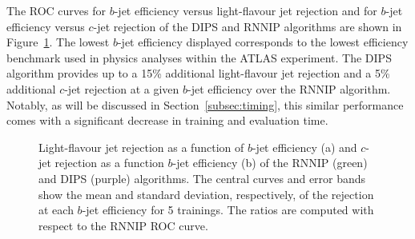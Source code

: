 The ROC curves for $b$-jet efficiency versus light-flavour jet rejection and for $b$-jet efficiency versus $c$-jet rejection of the DIPS and RNNIP algorithms are shown in Figure~\ref{fig:roc_rnnip_dips}. 
The lowest $b$-jet efficiency displayed corresponds to the lowest efficiency benchmark used in physics analyses within the ATLAS experiment. 
The DIPS algorithm provides up to a 15\% additional light-flavour jet rejection and a 5\% additional $c$-jet rejection at a given $b$-jet efficiency over the RNNIP algorithm. 
Notably, as will be discussed in Section~\ref{subsec:timing}, this similar performance comes with a significant decrease in training and evaluation time.

\begin{figure}[ht]
    \centering
    \caption{Light-flavour jet rejection as a function of $b$-jet efficiency (a) and $c$-jet rejection as a function $b$-jet efficiency (b) of the RNNIP (green) and DIPS (purple) algorithms. The central curves and error bands show the mean and standard deviation, respectively, of the rejection at each $b$-jet efficiency for 5 trainings. The ratios are computed with respect to the RNNIP ROC curve.}
    \label{fig:roc_rnnip_dips}
\end{figure}

